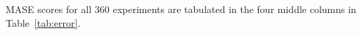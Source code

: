 MASE scores for all 360 experiments are tabulated in the four middle
columns in Table~\ref{tab:error}.
%
%
%
%
%
%
%
%
%
%  
